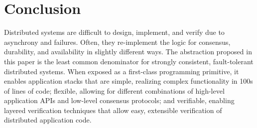 \section{Conclusion}

Distributed systems are difficult to design, implement, and verify due to asynchrony and failures. Often, they re-implement the logic for consensus, durability, and availability in slightly different ways. The \WOR{} abstraction proposed in this paper is the least common denominator for strongly consistent, fault-tolerant distributed systems. When exposed as a first-class programming primitive, it enables application stacks that are simple, realizing complex functionality in 100s of lines of code; flexible, allowing for different combinations of high-level application APIs and low-level consensus protocols; and verifiable, enabling layered verification techniques that allow easy, extensible verification of distributed application code.

